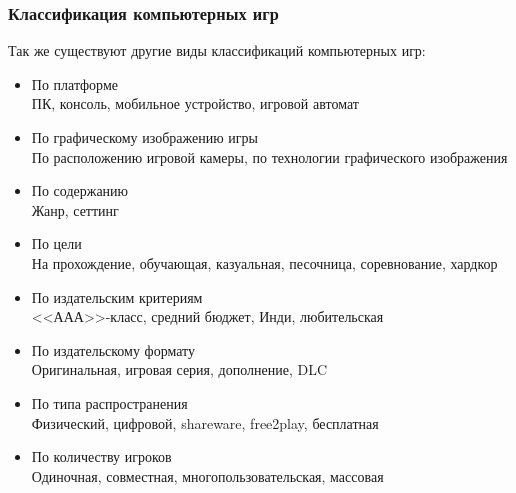 \begin{frame}
    \frametitle{Классификация компьютерных игр}
    Так же существуют другие виды классификаций компьютерных игр:
    \begin{itemize}
        \item По платформе\\
            \tiny ПК, консоль, мобильное устройство, игровой автомат
        \item \normalsize По графическому изображению игры\\
            \tiny По расположению игровой камеры, по технологии графического изображения
        \item \normalsize По содержанию\\
            \tiny Жанр, сеттинг
        \item \normalsize По цели\\
            \tiny На прохождение, обучающая, казуальная, песочница, соревнование, хардкор
        \item \normalsize По издательским критериям\\
            \tiny <<ААА>>-класс, средний бюджет, Инди, любительская
        \item \normalsize По издательскому формату\\
            \tiny Оригинальная, игровая серия, дополнение, DLC
        \item \normalsize По типа распространения\\
            \tiny Физический, цифровой, shareware, free2play, бесплатная 
        \item \normalsize По количеству игроков\\
            \tiny Одиночная, совместная, многопользовательская, массовая
    \end{itemize}
\end{frame}

